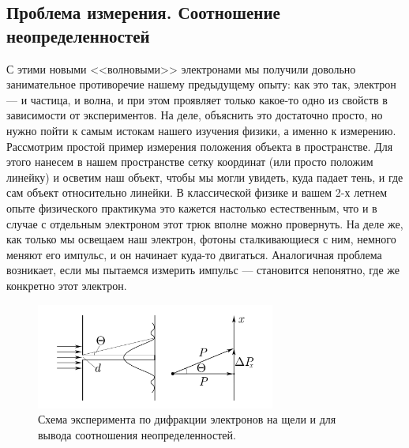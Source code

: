 \documentclass[12pt]{article}
\begin{document}
\subsection{Проблема измерения. Соотношение неопределенностей}
С этими новыми <<волновыми>> электронами мы получили довольно занимательное противоречие нашему предыдущему опыту: как это так, электрон --- и частица, и волна, и при этом проявляет только какое-то одно из свойств в зависимости от экспериментов. На деле, объяснить это достаточно просто, но нужно пойти к самым истокам нашего изучения физики, а именно к измерению. Рассмотрим простой пример измерения положения объекта в пространстве. Для этого нанесем в нашем пространстве сетку координат (или просто положим линейку) и осветим наш объект, чтобы мы могли увидеть, куда падает тень, и где сам объект относительно линейки. В классической физике и вашем 2-х летнем опыте физического практикума это кажется настолько естественным, что и в случае с отдельным электроном этот трюк вполне можно провернуть. На деле же, как только мы освещаем наш электрон, фотоны сталкивающиеся с ним, немного меняют его импульс, и он начинает куда-то двигаться. Аналогичная проблема возникает, если мы пытаемся измерить импульс --- становится непонятно, где же конкретно этот электрон.
\begin{figure}[h]
    \centering
    \includegraphics[width=0.7\textwidth,keepaspectratio]{Seminar_03/pics/pic_02.png}
    \caption{Схема эксперимента по дифракции электронов на щели и для вывода соотношения неопределенностей.}
    \label{fig:sem_03_electron_diffraction}
\end{figure}
\end{document}
